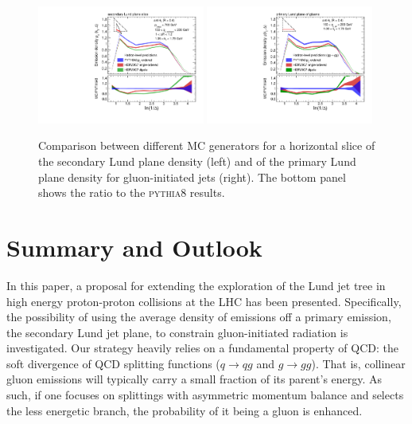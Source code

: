 \documentclass[a4paper,11pt]{article}
\newcommand{\py}{{\textsc{pythia}}8\xspace}
\begin{document}
\begin{figure}
    \centering
    \includegraphics[width = 0.49\textwidth]{figures/Figure6a.pdf}
        \includegraphics[width = 0.49\textwidth]{figures/Figure6b.pdf}
    \caption{Comparison between different MC generators for a horizontal slice of the secondary Lund plane density (left) and of the primary Lund plane density for gluon-initiated jets (right). The bottom panel shows the ratio to the \py results.}
    \label{fig:mc-comparison}
\end{figure}

\section{Summary and Outlook}
\label{sec:end}
In this paper, a proposal for extending the exploration of the Lund jet tree in high energy proton-proton collisions at the LHC has been presented. Specifically, the possibility of using the average density of emissions off a primary emission, the secondary Lund jet plane, to constrain gluon-initiated radiation is investigated. Our strategy heavily relies on a fundamental property of QCD: the soft divergence of QCD splitting functions ($q\to qg$ and $g\to gg$). That is, collinear gluon emissions will typically carry a small fraction of its parent's energy. As such, if one focuses on splittings with asymmetric momentum balance and selects the less energetic branch, the probability of it being a gluon is enhanced. 
\end{document}
